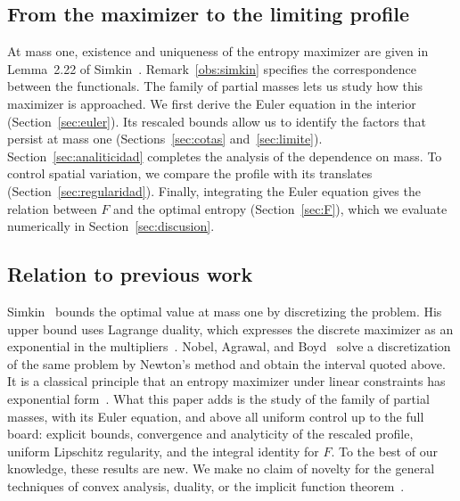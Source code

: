 \subsection{From the maximizer to the limiting profile}

At mass one, existence and uniqueness of the entropy maximizer are given in Lemma~2.22 of Simkin~\cite{Simkin}. Remark~\ref{obs:simkin}
specifies the correspondence between the functionals. The family of partial masses lets us study how this maximizer is approached. We
first derive the Euler equation in the interior (Section~\ref{sec:euler}). Its rescaled bounds allow us to identify the factors that
persist at mass one (Sections~\ref{sec:cotas} and~\ref{sec:limite}). Section~\ref{sec:analiticidad} completes the analysis of the
dependence on mass. To control spatial variation, we compare the profile with its translates (Section~\ref{sec:regularidad}). Finally,
integrating the Euler equation gives the relation between $F$ and the optimal entropy (Section~\ref{sec:F}), which we evaluate
numerically in Section~\ref{sec:discusion}.

\subsection{Relation to previous work}

Simkin~\cite{Simkin} bounds the optimal value at mass one by discretizing the problem. His upper bound uses Lagrange duality, which
expresses the discrete maximizer as an exponential in the multipliers~\cite[Section~6]{Simkin}. Nobel, Agrawal, and Boyd~\cite{NAB}
solve a discretization of the same problem by Newton's method and obtain the interval quoted above. It is a classical principle that an
entropy maximizer under linear constraints has exponential form~\cite{Csiszar}. What this paper adds is the study of the family of partial
masses, with its Euler equation, and above all uniform control up to the full board: explicit bounds, convergence and analyticity
of the rescaled profile, uniform Lipschitz regularity, and the integral identity for $F$. To the best of our knowledge, these results are new. We make no claim of novelty for the general techniques of convex analysis, duality,
or the implicit function theorem~\cite{Brezis,Zeidler}.
